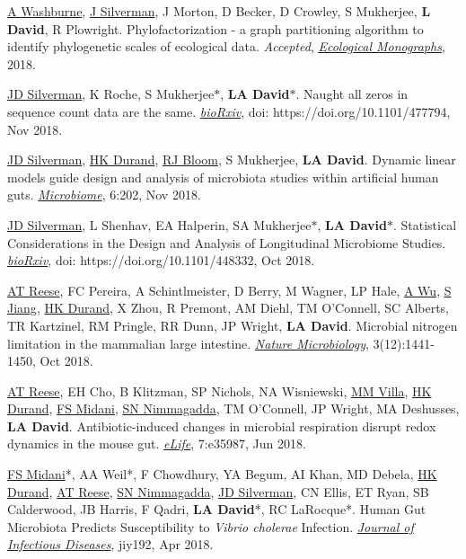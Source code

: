 \documentclass[overlapped,line,11pt]{res}
\begin{document}
\begin{resume}
\begin{revnumerate}[26]

\item{\ul{A Washburne}, \ul{J Silverman}, J Morton, D Becker, D
  Crowley, S Mukherjee, \textbf{L David}, R Plowright. Phylofactorization - a
  graph partitioning algorithm to identify phylogenetic scales of
  ecological data. \emph{Accepted}, \emph{\ul{Ecological Monographs}}, 2018.}

\item{\ul{JD Silverman}, K Roche, S Mukherjee$\ast$, \textbf{LA
      David}$\ast$. Naught all zeros in sequence count data are the
    same. \emph{\ul{bioRxiv}}}, doi: https://doi.org/10.1101/477794, Nov 2018.

  \item {\ul{JD Silverman}, \ul{HK Durand}, \ul{RJ Bloom}, S
    Mukherjee, \textbf{LA David}. Dynamic linear models guide design
    and analysis of microbiota studies within artificial human
    guts. \emph{\ul{Microbiome}}, 6:202, Nov 2018.}

\item{\ul{JD Silverman}, L Shenhav, EA Halperin, SA Mukherjee$\ast$,
  \textbf{LA David}$\ast$. Statistical Considerations in the Design
  and Analysis of Longitudinal Microbiome
  Studies. \emph{\ul{bioRxiv}}}, doi: https://doi.org/10.1101/448332,
  Oct 2018.

  \item {\ul{AT Reese}, FC Pereira, A Schintlmeister, D Berry, M
    Wagner, LP Hale, \ul{A Wu}, \ul{S Jiang}, \ul{HK Durand}, X Zhou,
    R Premont, AM Diehl, TM O’Connell, SC Alberts, TR Kartzinel, RM
    Pringle, RR Dunn, JP Wright, \textbf{LA David}. Microbial nitrogen
    limitation in the mammalian large intestine. \emph{\ul{Nature
        Microbiology}}, 3(12):1441-1450, Oct 2018.}

\item {\ul{AT Reese}, EH Cho, B Klitzman, SP Nichols, NA Wisniewski,
  \ul{MM Villa}, \ul{HK Durand}, \ul{FS Midani}, \ul{SN Nimmagadda},
  TM O’Connell, JP Wright, MA Deshusses, \textbf{LA
    David}. Antibiotic-induced changes in microbial respiration
  disrupt redox dynamics in the mouse gut. \emph{\ul{eLife}},
  7:e35987, Jun 2018.  }

\item {\ul{FS Midani}*, AA Weil*, F Chowdhury, YA Begum, AI Khan, MD
  Debela, \ul{HK Durand}, \ul{AT Reese}, \ul{SN Nimmagadda}, \ul{JD
    Silverman}, CN Ellis, ET Ryan, SB Calderwood,
    JB Harris, F Qadri, \textbf{LA David}*, RC
    LaRocque*. Human Gut Microbiota Predicts Susceptibility to \emph{Vibrio
    cholerae} Infection. \emph{\ul{Journal of Infectious Diseases}},
    jiy192, Apr 2018.}


\end{revnumerate}
\end{resume}
\end{document}
